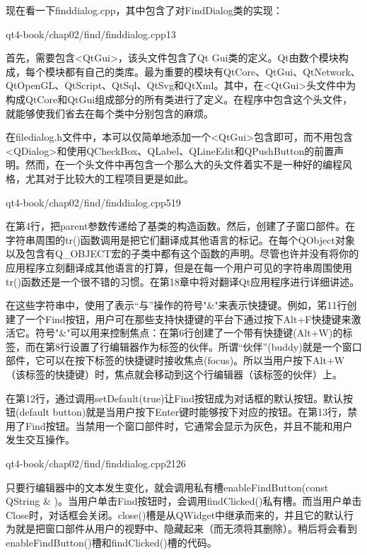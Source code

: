 \documentclass[11pt,oneside]{book}
\begin{document}
\begin{common-format}
现在看一下finddialog.cpp，其中包含了对FindDialog类的实现：
\begin{cppline}[1]{qt4-book/chap02/find/finddialog.cpp}{1}{3}
\end{cppline}

首先，需要包含<QtGui>，该头文件包含了Qt Gui类的定义。Qt由数个模块构成，每个模块都有自己的类库。最为重要的模块有QtCore、QtGui、QtNetwork、QtOpenGL、QtScript、QtSql、QtSvg和QtXml。其中，在<QtGui>头文件中为构成QtCore和QtGui组成部分的所有类进行了定义。在程序中包含这个头文件，就能够使我们省去在每个类中分别包含的麻烦。

在filedialog.h文件中，本可以仅简单地添加一个<QtGui>包含即可，而不用包含<QDialog>和使用QCheckBox、QLabel、QLineEdit和QPushButton的前置声明。然而，在一个头文件中再包含一个那么大的头文件着实不是一种好的编程风格，尤其对于比较大的工程项目更是如此。

\begin{cppline}[3]{qt4-book/chap02/find/finddialog.cpp}{5}{19}
\end{cppline}

在第4行，把parent参数传递给了基类的构造函数。然后，创建了子窗口部件。在字符串周围的tr()函数调用是把它们翻译成其他语言的标记。在每个QObject对象以及包含有Q\_{}OBJECT宏的子类中都有这个函数的声明。尽管也许并没有将你的应用程序立刻翻译成其他语言的打算，但是在每一个用户可见的字符串周围使用tr()函数还是一个很不错的习惯。在第18章中将对翻译Qt应用程序进行详细讲述。

在这些字符串中，使用了表示“与”操作的符号"\&{}"来表示快捷键。例如，笫11行创建了一个Find按钮，用户可在那些支持快捷键的平台下通过按下Alt+F快捷键来激活它。符号"\&{}"可以用来控制焦点：在第6行创建了一个带有快捷键(Alt+W)的标签，而在第8行设置了行编辑器作为标签的伙伴。所谓“伙伴”(buddy)就是一个窗口部件，它可以在按下标签的快捷键时接收焦点(focus)。所以当用户按下Alt+W（该标签的快捷键）时，焦点就会移动到这个行编辑器（该标签的伙伴）上。

在第12行，通过调用setDefault(true)让Find按钮成为对话框的默认按钮。默认按钮(default button)就是当用户按下Enter键时能够按下对应的按钮。在第13行，禁用了Find按钮。当禁用一个窗口部件时，它通常会显示为灰色，并且不能和用户发生交互操作。

\begin{cppline}[15]{qt4-book/chap02/find/finddialog.cpp}{21}{26}
\end{cppline}

只要行编辑器中的文本发生变化，就会调用私有槽enableFindButton(const QString \& )。当用户单击Find按钮时，会调用findClicked()私有槽。而当用户单击Close时，对话框会关闭。close()槽是从QWidget中继承而来的，并且它的默认行为就是把窗口部件从用户的视野中、隐藏起来（而无须将其删除）。稍后将会看到enableFindButton()槽和findClicked()槽的代码。


\end{common-format}
\end{document}
